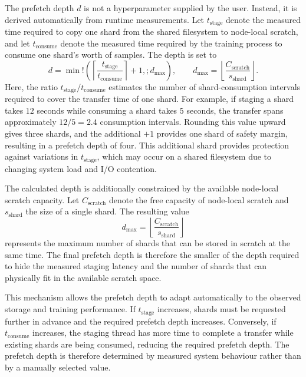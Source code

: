 The prefetch depth $d$ is not a hyperparameter supplied by the user. Instead, it is derived automatically from runtime measurements. Let $t_{\text{stage}}$ denote the measured time required to copy one shard from the shared filesystem to node-local scratch, and let $t_{\text{consume}}$ denote the measured time required by the training process to consume one shard's worth of samples. The depth is set to
%
\begin{equation}
d = \min!\left(
\left\lceil
\frac{t_{\text{stage}}}{t_{\text{consume}}}
\right\rceil + 1,
; d_{\max}
\right),
\qquad
d_{\max} =
\left\lfloor
\frac{C_{\text{scratch}}}{s_{\text{shard}}}
\right\rfloor .
\end{equation}
%
Here, the ratio $t_{\text{stage}}/t_{\text{consume}}$ estimates the number of shard-consumption intervals required to cover the transfer time of one shard. For example, if staging a shard takes $12$ seconds while consuming a shard takes $5$ seconds, the transfer spans approximately $12/5 = 2.4$ consumption intervals. Rounding this value upward gives three shards, and the additional $+1$ provides one shard of safety margin, resulting in a prefetch depth of four. This additional shard provides protection against variations in $t_{\text{stage}}$, which may occur on a shared filesystem due to changing system load and I/O contention.

The calculated depth is additionally constrained by the available node-local scratch capacity. Let $C_{\text{scratch}}$ denote the free capacity of node-local scratch and $s_{\text{shard}}$ the size of a single shard. The resulting value
%
\[
d_{\max} =
\left\lfloor
\frac{C_{\text{scratch}}}{s_{\text{shard}}}
\right\rfloor
\]
%
represents the maximum number of shards that can be stored in scratch at the same time. The final prefetch depth is therefore the smaller of the depth required to hide the measured staging latency and the number of shards that can physically fit in the available scratch space.

This mechanism allows the prefetch depth to adapt automatically to the observed storage and training performance. If $t_{\text{stage}}$ increases, shards must be requested further in advance and the required prefetch depth increases. Conversely, if $t_{\text{consume}}$ increases, the staging thread has more time to complete a transfer while existing shards are being consumed, reducing the required prefetch depth. The prefetch depth is therefore determined by measured system behaviour rather than by a manually selected value.

